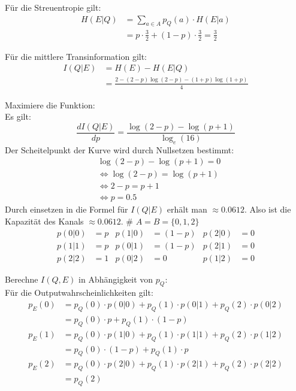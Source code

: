 \begin{myList}
Für die Streuentropie gilt:
\begin{align*}
	H(E|Q) &= \sum\limits_{a \in A} p_Q(a) \cdot H(E|a) \\
	&= p \cdot \frac{3}{2} + (1-p) \cdot \frac{3}{2} = \frac{3}{2}
\end{align*}

Für die mittlere Transinformation gilt:
\begin{align*}
	I(Q|E) &= H(E) - H(E|Q)\\
	&= \frac{2 -(2-p)\log(2-p) - (1+p)\log(1+p)}{4}
\end{align*}

Maximiere die Funktion:\\
Es gilt:
\begin{equation*}
	\frac{dI(Q|E)}{dp} = \frac{\log(2-p)- \log(p+1)}{\log_e(16)}
\end{equation*}
Der Scheitelpunkt der Kurve wird durch Nullsetzen bestimmt:
\begin{align*}
	&\log(2-p) - \log(p+1) = 0 \\
	&\Leftrightarrow \log(2-p) = \log(p+1) \\
	&\Leftrightarrow 2-p = p+1 \\
	&\Leftrightarrow p = 0.5
\end{align*}
Durch einsetzen in die Formel für $I(Q|E)$ erhält man $\approx 0.0612$.
Also ist die Kapazität des Kanals $\approx 0.0612$.
#
$A = B = \lbrace 0,1,2 \rbrace$
\begin{align*}
	p(0|0) &= p & p(1|0) &= (1-p) & p(2|0) &= 0 \\
	p(1|1) &= p & p(0|1) &= (1-p) & p(2|1) &= 0 \\
	p(2|2) &= 1 & p(0|2) &= 0 & p(1|2) &= 0
\end{align*}

Berechne $I(Q,E)$ in Abhängigkeit von $p_Q$:\\
Für die Outputwahrscheinlichkeiten gilt:
\begin{align*}
	p_E(0) &= p_Q(0) \cdot p(0|0) + p_Q(1) \cdot p(0|1) + p_Q(2) \cdot p(0|2) \\
	&= p_Q(0) \cdot p + p_Q(1) \cdot (1-p) \\
	p_E(1) &= p_Q(0) \cdot p(1|0) + p_Q(1) \cdot p(1|1) + p_Q(2) \cdot p(1|2)\\
	&= p_Q(0) \cdot (1-p) + p_Q(1) \cdot p \\
	p_E(2) &= p_Q(0) \cdot p(2|0) + p_Q(1) \cdot p(2|1) + p_Q(2) \cdot p(2|2)\\
	&= p_Q(2)
\end{align*}


\end{myList}
